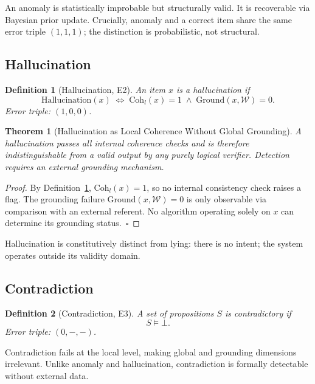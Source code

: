 \documentclass{article}
\newtheorem{theorem}{Theorem}
\newtheorem{definition}{Definition}
\begin{document}
An anomaly is statistically improbable but structurally valid.  It is recoverable
via Bayesian prior update.  Crucially, anomaly and a correct item share the same
error triple $(1,1,1)$; the distinction is probabilistic, not structural.

\subsection{Hallucination}

\begin{definition}[Hallucination, E2]
\label{def:hallucination}
An item $x$ is a \emph{hallucination} if
\[
  \mathrm{Hallucination}(x) \;\iff\;
  \mathrm{Coh}_l(x) = 1 \;\wedge\; \mathrm{Ground}(x, \mathcal{W}) = 0.
\]
Error triple: $(1, 0, 0)$.
\end{definition}

\begin{theorem}[Hallucination as Local Coherence Without Global Grounding]
\label{thm:hallucination}
A hallucination passes all internal coherence checks and is therefore
indistinguishable from a valid output by any purely logical verifier.  Detection
requires an external grounding mechanism.
\end{theorem}

\begin{proof}
By Definition~\ref{def:hallucination}, $\mathrm{Coh}_l(x) = 1$, so no internal
consistency check raises a flag.  The grounding failure $\mathrm{Ground}(x,
\mathcal{W}) = 0$ is only observable via comparison with an external referent.
No algorithm operating solely on $x$ can determine its grounding status.~$\square$
\end{proof}

Hallucination is constitutively distinct from lying: there is no intent; the
system operates outside its validity domain.

\subsection{Contradiction}

\begin{definition}[Contradiction, E3]
A set of propositions $S$ is \emph{contradictory} if
\[
  S \models \bot.
\]
Error triple: $(0, -, -)$.
\end{definition}

Contradiction fails at the local level, making global and grounding dimensions
irrelevant.  Unlike anomaly and hallucination, contradiction is formally
detectable without external data.
\end{document}
